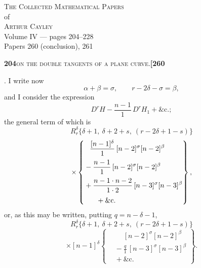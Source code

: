 \documentclass[11pt]{article}
\begin{document}
\thispagestyle{empty}
\begin{center}
\vspace*{2cm}
{\Large\scshape The Collected Mathematical Papers}\\[0.4em]
{\large of}\\[0.4em]
{\Large\scshape Arthur Cayley}\\[1.5em]
{\large Volume IV --- pages 204--228}\\[0.6em]
{\normalsize Papers 260 (conclusion), 261}\\[2em]
\vfill
\end{center}
\newpage

\setcounter{page}{204}


\noindent\textbf{204}\hfill\textsc{on the double tangents of a plane curve.}\hfill\textbf{[260}

\medskip

. I write now
\[
\alpha + \beta = \sigma,\qquad r - 2\delta - \sigma = \beta,
\]
and I consider the expression
\[
D^r H - \frac{n-1}{1}\,D^r H_1 + \&\text{c.};
\]
the general term of which is
\[
R_r^\delta\{\delta+1,\ \delta+2+s,\ (r-2\delta+1-s)\}
\]
\[
\times \left\{
\begin{aligned}
&\phantom{-} \frac{[n-1]^\delta}{1}\,[n-2]^\sigma[n-2]^\beta\\[2pt]
&{} - \frac{n-1}{1}\,[n-2]^\sigma[n-2]^\beta\\[2pt]
&{} + \frac{n-1\cdot n-2}{1\cdot 2}\,[n-3]^\sigma[n-3]^\beta\\[2pt]
&\hphantom{xxx}{} + \&\text{c.}
\end{aligned}
\right\},
\]
or, as this may be written, putting $q = n - \delta - 1$,
\[
R_r^\delta\{\delta+1,\ \delta+2+s,\ (r-2\delta+1-s)\}
\]
\[
\times [n-1]^\delta\left\{
\begin{aligned}
&\phantom{-} [n-2]^\sigma[n-2]^\beta\\[2pt]
&{} - \frac{q}{1}\,[n-3]^\sigma[n-3]^\beta\\[2pt]
&{} + \&\text{c.}
\end{aligned}
\right\}.
\]

\medskip
\end{document}
